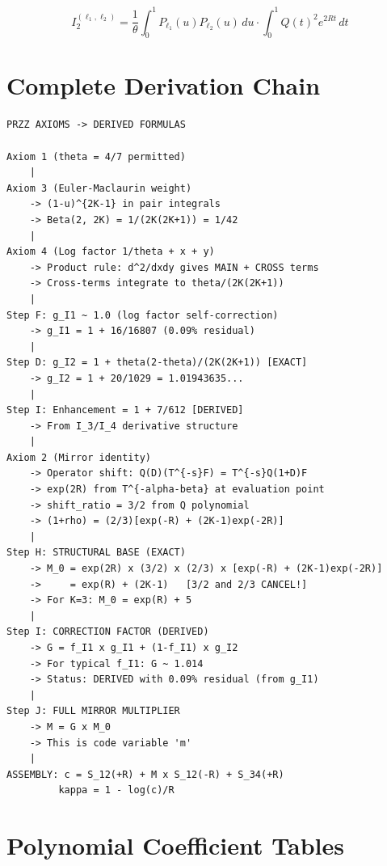 \documentclass[11pt]{article}
\begin{document}
\begin{equation}
I_2^{(\ell_1,\ell_2)} = \frac{1}{\theta} \int_0^1 P_{\ell_1}(u) P_{\ell_2}(u) \, du \cdot \int_0^1 Q(t)^2 e^{2Rt} \, dt
\end{equation}

\section{Complete Derivation Chain}
\label{app:chain}

\begin{verbatim}
PRZZ AXIOMS -> DERIVED FORMULAS

Axiom 1 (theta = 4/7 permitted)
    |
Axiom 3 (Euler-Maclaurin weight)
    -> (1-u)^{2K-1} in pair integrals
    -> Beta(2, 2K) = 1/(2K(2K+1)) = 1/42
    |
Axiom 4 (Log factor 1/theta + x + y)
    -> Product rule: d^2/dxdy gives MAIN + CROSS terms
    -> Cross-terms integrate to theta/(2K(2K+1))
    |
Step F: g_I1 ~ 1.0 (log factor self-correction)
    -> g_I1 = 1 + 16/16807 (0.09% residual)
    |
Step D: g_I2 = 1 + theta(2-theta)/(2K(2K+1)) [EXACT]
    -> g_I2 = 1 + 20/1029 = 1.01943635...
    |
Step I: Enhancement = 1 + 7/612 [DERIVED]
    -> From I_3/I_4 derivative structure
    |
Axiom 2 (Mirror identity)
    -> Operator shift: Q(D)(T^{-s}F) = T^{-s}Q(1+D)F
    -> exp(2R) from T^{-alpha-beta} at evaluation point
    -> shift_ratio = 3/2 from Q polynomial
    -> (1+rho) = (2/3)[exp(-R) + (2K-1)exp(-2R)]
    |
Step H: STRUCTURAL BASE (EXACT)
    -> M_0 = exp(2R) x (3/2) x (2/3) x [exp(-R) + (2K-1)exp(-2R)]
    ->     = exp(R) + (2K-1)   [3/2 and 2/3 CANCEL!]
    -> For K=3: M_0 = exp(R) + 5
    |
Step I: CORRECTION FACTOR (DERIVED)
    -> G = f_I1 x g_I1 + (1-f_I1) x g_I2
    -> For typical f_I1: G ~ 1.014
    -> Status: DERIVED with 0.09% residual (from g_I1)
    |
Step J: FULL MIRROR MULTIPLIER
    -> M = G x M_0
    -> This is code variable 'm'
    |
ASSEMBLY: c = S_12(+R) + M x S_12(-R) + S_34(+R)
         kappa = 1 - log(c)/R
\end{verbatim}

\section{Polynomial Coefficient Tables}
\label{app:coeffs}
\end{document}
